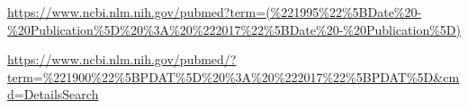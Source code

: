 \urldef\pubmedquery\url{https://www.ncbi.nlm.nih.gov/pubmed?term=(%221995%22%5BDate%20-%20Publication%5D%20%3A%20%222017%22%5BDate%20-%20Publication%5D)}

\urldef\pubmedquery\url{https://www.ncbi.nlm.nih.gov/pubmed/?term=%221900%22%5BPDAT%5D%20%3A%20%222017%22%5BPDAT%5D&cmd=DetailsSearch}

\usepackage{multirow}
\usepackage{subfigure}
\usepackage{pbox}
\usepackage{bm}
\usepackage{latexsym}
\usepackage{csquotes}
\usepackage{amsmath}
\usepackage{pdflscape}
\usepackage{fancyref}

\usepackage{varwidth}
\usepackage{tikz}
\usetikzlibrary{automata, calc, backgrounds, er, trees, fit, positioning, arrows, chains, shapes.geometric, decorations.pathreplacing, decorations.pathmorphing,shapes, matrix, shapes.symbols}
\usepackage{tikz-qtree}
\usepackage{tikz-dependency}
\usepackage{enumitem}

%

% 


\usepackage{placeins}

\let\Oldsection\section
\renewcommand{\section}{\FloatBarrier\Oldsection}

\let\Oldsubsection\subsection
\renewcommand{\subsection}{\FloatBarrier\Oldsubsection}

\let\Oldsubsubsection\subsubsection
\renewcommand{\subsubsection}{\FloatBarrier\Oldsubsubsection}



